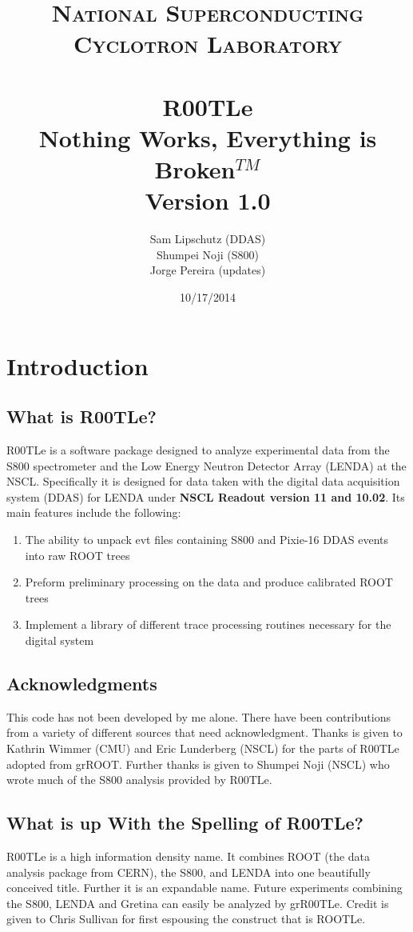 \documentclass[paper=a4, fontsize=12pt]{scrartcl} %
\title{	
\normalfont \normalsize
\textsc{National Superconducting Cyclotron Laboratory} \\ [25pt] %
\horrule{0.5pt} \\[0.4cm] %
\huge  R00TLe \\ %
\small Nothing Works, Everything is Broken$^{TM}$\\
Version 1.0
\horrule{2pt} \\[0.5cm] %
}
\author{Sam Lipschutz (DDAS) \\ Shumpei Noji (S800) \\ Jorge Pereira (updates)} %
\date{\normalsize 10/17/2014} %
\numberwithin{equation}{section} %
\numberwithin{figure}{section} %
\numberwithin{table}{section} %
\begin{document}
\maketitle %

\tableofcontents
\pagebreak
\section{Introduction}


\subsection{What is R00TLe?}

R00TLe is a software package designed to analyze experimental data from the S800 spectrometer and the Low Energy Neutron Detector Array (LENDA) at the NSCL.  Specifically it is designed for data taken with the digital data acquisition system (DDAS) for LENDA under \textbf{NSCL Readout version 11 and 10.02}.  Its main features include the following:

\begin{enumerate}
  \item The ability to unpack evt files containing S800 and Pixie-16 DDAS events into raw ROOT trees
  \item Preform preliminary processing on the data and produce calibrated ROOT trees
  \item Implement a library of different trace processing routines necessary for the digital system
\end{enumerate}

\subsection{Acknowledgments}

This code has not been developed by me alone.  There have been contributions from a variety of different sources that need acknowledgment.  Thanks is given to Kathrin Wimmer (CMU) and Eric Lunderberg (NSCL) for the parts of R00TLe adopted from grROOT.  Further thanks is given to Shumpei Noji (NSCL) who wrote much of the S800 analysis provided by R00TLe.

\subsection{What is up With the Spelling of R00TLe?}
R00TLe is a high information density name.  It combines ROOT (the data analysis package from CERN), the S800, and LENDA into one beautifully conceived title.  Further it is an expandable name.  Future experiments combining the S800, LENDA and Gretina can easily be analyzed by grR00TLe.  Credit is given to Chris Sullivan for first espousing the construct that is ROOTLe.
\end{document}
